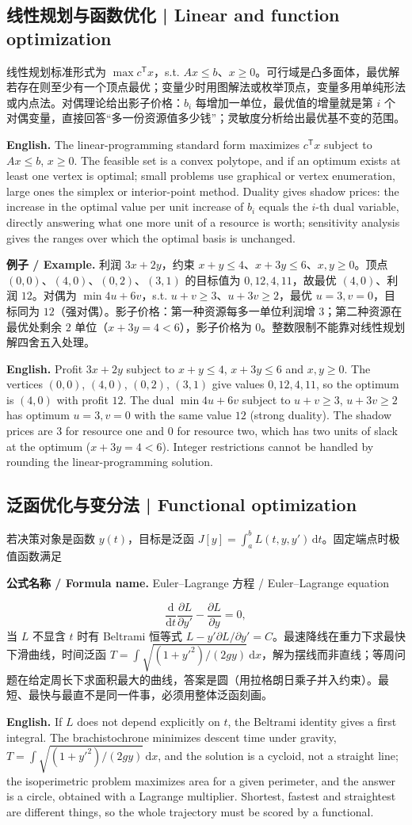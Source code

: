 \documentclass[UTF8,11pt,a4paper]{ctexart}
\newcommand{\EN}[1]{\par\noindent\textbf{English.} #1\par}
\newcommand{\FORMULA}[2]{\par\noindent\textbf{公式名称 / Formula name.} #1 / #2\par}
\newcommand{\EX}[2]{\par\noindent\textbf{例子 / Example.} #1\par\EN{#2}}
\begin{document}
\subsection{线性规划与函数优化 | Linear and function optimization}
线性规划标准形式为 $\max c^{\mathsf T}x$，s.t. $Ax\le b$、$x\ge0$。可行域是凸多面体，最优解若存在则至少有一个顶点最优；变量少时用图解法或枚举顶点，变量多用单纯形法或内点法。对偶理论给出影子价格：$b_i$ 每增加一单位，最优值的增量就是第 $i$ 个对偶变量，直接回答“多一份资源值多少钱”；灵敏度分析给出最优基不变的范围。
\EN{The linear-programming standard form maximizes $c^{\mathsf T}x$ subject to $Ax\le b$, $x\ge0$. The feasible set is a convex polytope, and if an optimum exists at least one vertex is optimal; small problems use graphical or vertex enumeration, large ones the simplex or interior-point method. Duality gives shadow prices: the increase in the optimal value per unit increase of $b_i$ equals the $i$-th dual variable, directly answering what one more unit of a resource is worth; sensitivity analysis gives the ranges over which the optimal basis is unchanged.}
\EX{利润 $3x+2y$，约束 $x+y\le4$、$x+3y\le6$、$x,y\ge0$。顶点 $(0,0)$、$(4,0)$、$(0,2)$、$(3,1)$ 的目标值为 $0,12,4,11$，故最优 $(4,0)$、利润 $12$。对偶为 $\min4u+6v$，s.t. $u+v\ge3$、$u+3v\ge2$，最优 $u=3,v=0$，目标同为 $12$（强对偶）。影子价格：第一种资源每多一单位利润增 $3$；第二种资源在最优处剩余 $2$ 单位（$x+3y=4<6$），影子价格为 $0$。整数限制不能靠对线性规划解四舍五入处理。}{Profit $3x+2y$ subject to $x+y\le4$, $x+3y\le6$ and $x,y\ge0$. The vertices $(0,0)$, $(4,0)$, $(0,2)$, $(3,1)$ give values $0,12,4,11$, so the optimum is $(4,0)$ with profit $12$. The dual $\min4u+6v$ subject to $u+v\ge3$, $u+3v\ge2$ has optimum $u=3,v=0$ with the same value $12$ (strong duality). The shadow prices are $3$ for resource one and $0$ for resource two, which has two units of slack at the optimum ($x+3y=4<6$). Integer restrictions cannot be handled by rounding the linear-programming solution.}


\subsection{泛函优化与变分法 | Functional optimization}
若决策对象是函数 $y(t)$，目标是泛函 $J[y]=\int_a^bL(t,y,y')\,\mathrm dt$。固定端点时极值函数满足
\FORMULA{Euler--Lagrange 方程}{Euler--Lagrange equation}
\[
\frac{\mathrm d}{\mathrm dt}\frac{\partial L}{\partial y'}-\frac{\partial L}{\partial y}=0 ,
\]
当 $L$ 不显含 $t$ 时有 Beltrami 恒等式 $L-y'\partial L/\partial y'=C$。最速降线在重力下求最快下滑曲线，时间泛函 $T=\int\sqrt{(1+y'^2)/(2gy)}\,\mathrm dx$，解为摆线而非直线；等周问题在给定周长下求面积最大的曲线，答案是圆（用拉格朗日乘子并入约束）。最短、最快与最直不是同一件事，必须用整体泛函刻画。
\EN{If $L$ does not depend explicitly on $t$, the Beltrami identity gives a first integral. The brachistochrone minimizes descent time under gravity, $T=\int\sqrt{(1+y'^2)/(2gy)}\,\mathrm dx$, and the solution is a cycloid, not a straight line; the isoperimetric problem maximizes area for a given perimeter, and the answer is a circle, obtained with a Lagrange multiplier. Shortest, fastest and straightest are different things, so the whole trajectory must be scored by a functional.}
\end{document}
